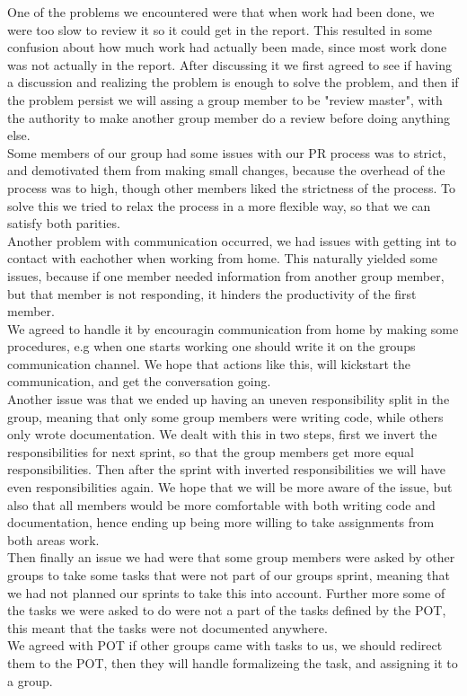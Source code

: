 One of the problems we encountered were that when work had been done, we were too slow to review it so it could get in the report. This resulted in some confusion about how much work had actually been made, since most  work done was not actually in the report. After discussing it we first agreed to see if having a discussion and realizing the problem is enough to solve the problem, and then if the problem persist we will assing a group member to be "review master", with the authority to make another group member do a review before doing anything else. \\
Some members of our group had some issues with our \gls{PR} process was to strict, and demotivated them from making small changes, because the overhead of the process was to high, though other members liked the strictness of the process. To solve this we tried to relax the process in a more flexible way, so that we can satisfy both parities. \\
Another problem with communication occurred, we had issues with getting int to contact with eachother when working from home.  This naturally yielded some issues, because if one member needed information from another group member,  but that member is not responding, it hinders the productivity of the first member.\\
We agreed to handle it by encouragin communication from home by making some procedures, e.g when one starts working one should write it on the groups communication channel. We hope that actions like this, will kickstart the communication, and get the conversation going. \\
Another issue was that we ended up having an uneven responsibility split in the group, meaning that only some group members were writing code, while others only wrote documentation. We dealt with this in two steps, first we invert the responsibilities for next sprint, so that the group members get more equal responsibilities. Then after the sprint with inverted responsibilities we will have even responsibilities again. We hope that we will be more aware of the issue, but also that all members would be more comfortable with both writing code and documentation, hence ending up being more willing to take assignments from both areas work.\\
Then finally an issue we had were that some group members were asked by other groups to take some tasks that were not part of our groups sprint, meaning that we had not planned our sprints to take this into account. Further more some of the tasks we were asked to do were not a part of the tasks defined by the \gls{POT}, this meant that the tasks were not documented anywhere.\\
We agreed with \gls{POT} if other groups came with tasks to us, we should redirect them to the \gls{POT}, then they will handle formalizeing the task, and assigning it to a group.

